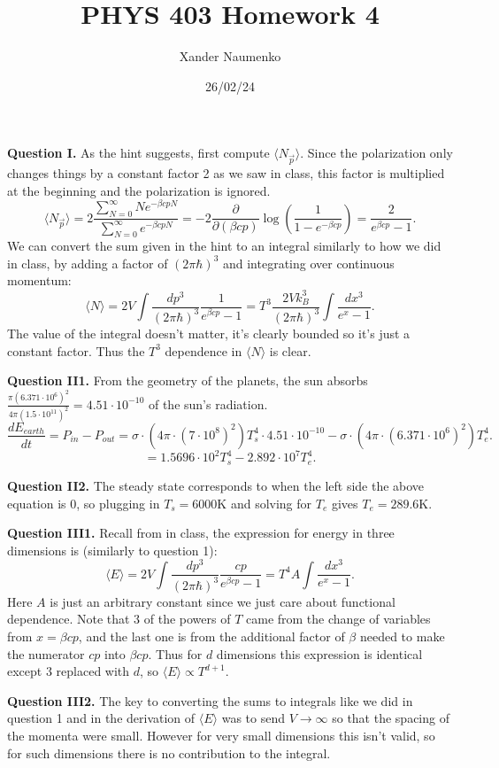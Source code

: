 \documentclass[letterpaper, reqno,11pt]{article}
\begin{document}
\title{PHYS 403 Homework 4}
\date{26/02/24}
\author{Xander Naumenko}
\maketitle

{\medskip\noindent\bf Question I.} As the hint suggests, first compute $\langle N_{\vec p} \rangle $. Since the polarization only changes things by a constant factor 2 as we saw in class, this factor is multiplied at the beginning and the polarization is ignored.
\[
    \langle N_{\vec p} \rangle =2\frac{\sum_{N=0}^{\infty}Ne^{-\beta cpN}}{\sum_{N=0}^{\infty}e^{-\beta cpN}}=- 2\frac{\partial}{\partial (\beta cp)}\log \left( \frac{1}{1-e^{-\beta cp}} \right) =\frac{2}{e^{\beta cp}-1}
.\]
We can convert the sum given in the hint to an integral similarly to how we did in class, by adding a factor of $(2\pi \hbar)^3$ and integrating over continuous momentum:
\[
\langle N \rangle = 2V\int \frac{dp^{3}}{(2\pi \hbar)^3} \frac{1}{e^{\beta cp}-1}=T^{3} \frac{2Vk_B^{3}}{(2\pi \hbar)^3}\int \frac{dx^{3}}{e^{x}-1}
.\]
The value of the integral doesn't matter, it's clearly bounded so it's just a constant factor. Thus the $T^{3}$ dependence in $\langle N \rangle $ is clear.

\medskip

{\medskip\noindent\bf Question II1.} From the geometry of the planets, the sun absorbs $\frac{\pi (6.371\cdot 10^{6})^2}{4\pi (1.5\cdot 10^{11})^2}=4.51\cdot 10^{-10}$ of the sun's radiation.
\[
\frac{dE_{earth}}{dt}=P_{in}-P_{out}=\sigma\cdot \left( 4\pi\cdot (7\cdot 10^{8})^2 \right)  T_{s}^{4}\cdot 4.51\cdot 10^{-10}- \sigma\cdot \left( 4\pi\cdot (6.371\cdot 10^{6})^2 \right) T_{e}^{4}
.\]
\[
=1.5696\cdot 10^{2}T_{s}^{4}- 2.892\cdot 10^{7}T_e^{4}
.\]

{\medskip\noindent\bf Question II2.} The steady state corresponds to when the left side the above equation is 0, so plugging in $T_s=6000$K and solving for $T_e$ gives $T_e=289.6$K.

{\medskip\noindent\bf Question III1.} Recall from in class, the expression for energy in three dimensions is (similarly to question 1):
\[
\langle E \rangle = 2V\int \frac{dp^{3}}{(2\pi \hbar)^3} \frac{cp}{e^{\beta cp}-1}=T^{4}A \int \frac{dx^{3}}{e^{x}-1}
.\]
Here $A$ is just an arbitrary constant since we just care about functional dependence. Note that $3$ of the powers of $T$ came from the change of variables from $x=\beta cp$, and the last one is from the additional factor of $\beta$ needed to make the numerator $cp$ into $\beta cp$. Thus for $d$ dimensions this expression is identical except $3$ replaced with $d$, so $\langle E \rangle \propto T^{d+1}$.

{\medskip\noindent\bf Question III2.} The key to converting the sums to integrals like we did in question 1 and in the derivation of $\langle E \rangle $ was to send $V\to \infty$ so that the spacing of the momenta were small. However for very small dimensions this isn't valid, so for such dimensions there is no contribution to the integral.
\end{document}
